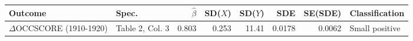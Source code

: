 
\begin{tabular}{llrrrrrl}
\toprule
Outcome & Spec. & $\hat{\beta}$ & SD($X$) & SD($Y$) & SDE & SE(SDE) & Classification\\
\midrule
$\Delta$OCCSCORE (1910-1920) & Table 2, Col. 3 & 0.803 & 0.253 & 11.41 & 0.0178 & 0.0062 & Small positive\\
\bottomrule
\end{tabular}
